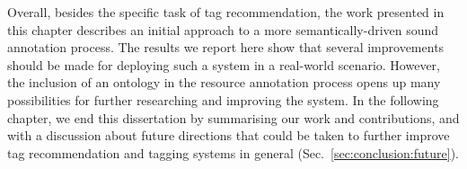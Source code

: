 Overall, besides the specific task of tag recommendation, the work presented in this chapter describes an initial approach to a more semantically-driven sound annotation process. 
The results we report here show that several improvements should be made for deploying such a system in a real-world scenario.
However, the inclusion of an ontology in the resource annotation process opens up many possibilities for further researching and improving the system. 
In the following chapter, we end this dissertation by summarising our work and contributions, and with a discussion about future directions that could be taken to further improve tag recommendation and tagging systems in general (Sec.~\ref{sec:conclusion:future}).
